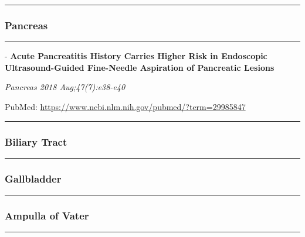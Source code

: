 \documentclass[]{article}
\begin{document}
\begin{center}\rule{0.5\linewidth}{\linethickness}\end{center}

\hypertarget{pancreas-1}{%
\subsubsection{Pancreas}\label{pancreas-1}}

\begin{center}\rule{0.5\linewidth}{\linethickness}\end{center}

 - \textbf{Acute Pancreatitis History Carries Higher Risk in Endoscopic
Ultrasound-Guided Fine-Needle Aspiration of Pancreatic Lesions}

\emph{Pancreas 2018 Aug;47(7):e38-e40}

PubMed: \url{https://www.ncbi.nlm.nih.gov/pubmed/?term=29985847}

{}

{}

\begin{center}\rule{0.5\linewidth}{\linethickness}\end{center}

\hypertarget{biliary-tract-1}{%
\subsubsection{Biliary Tract}\label{biliary-tract-1}}

\begin{center}\rule{0.5\linewidth}{\linethickness}\end{center}

\hypertarget{gallbladder-1}{%
\subsubsection{Gallbladder}\label{gallbladder-1}}

\begin{center}\rule{0.5\linewidth}{\linethickness}\end{center}

\hypertarget{ampulla-of-vater-1}{%
\subsubsection{Ampulla of Vater}\label{ampulla-of-vater-1}}

\begin{center}\rule{0.5\linewidth}{\linethickness}\end{center}
\end{document}

